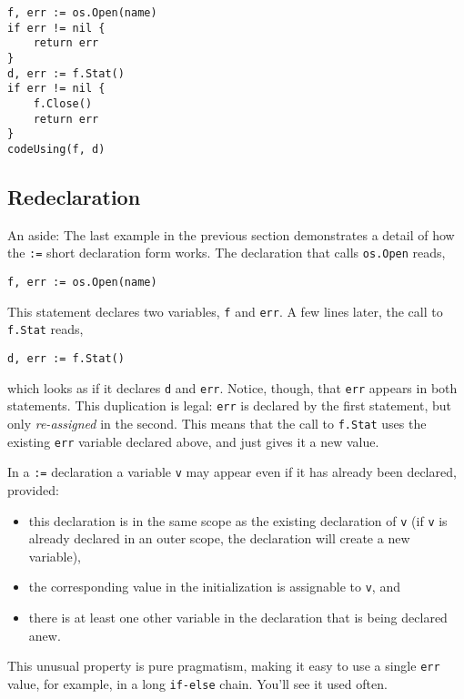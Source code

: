 \begin{Verbatim}[frame=single]
f, err := os.Open(name)
if err != nil {
    return err
}
d, err := f.Stat()
if err != nil {
    f.Close()
    return err
}
codeUsing(f, d)
\end{Verbatim}

\subsection*{Redeclaration}

An aside: The last example in the previous section demonstrates a detail
of how the \texttt{:=} short declaration form works. The declaration
that calls \texttt{os.Open} reads,

\begin{Verbatim}[frame=single]
f, err := os.Open(name)
\end{Verbatim}

This statement declares two variables, \texttt{f} and \texttt{err}. A
few lines later, the call to \texttt{f.Stat} reads,

\begin{Verbatim}[frame=single]
d, err := f.Stat()
\end{Verbatim}

which looks as if it declares \texttt{d} and \texttt{err}. Notice,
though, that \texttt{err} appears in both statements. This duplication
is legal: \texttt{err} is declared by the first statement, but only
\emph{re-assigned} in the second. This means that the call to
\texttt{f.Stat} uses the existing \texttt{err} variable declared above,
and just gives it a new value.

In a \texttt{:=} declaration a variable \texttt{v} may appear even if it
has already been declared, provided:

\begin{itemize}
\item
  this declaration is in the same scope as the existing declaration of
  \texttt{v} (if \texttt{v} is already declared in an outer scope, the
  declaration will create a new variable),
\item
  the corresponding value in the initialization is assignable to
  \texttt{v}, and
\item
  there is at least one other variable in the declaration that is being
  declared anew.
\end{itemize}

This unusual property is pure pragmatism, making it easy to use a single
\texttt{err} value, for example, in a long \texttt{if-else} chain.
You'll see it used often.

